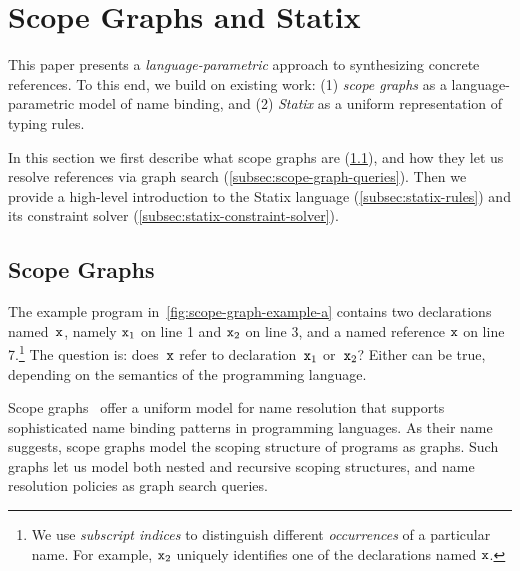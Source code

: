 \section{Scope Graphs and Statix}%
\label{sec:scope-graphs-and-statix}

This paper presents a \emph{language-parametric} approach to synthesizing concrete references.
To this end, we build on existing work: (1) \emph{scope graphs} as a language-parametric model of name binding,
and (2) \emph{Statix} as a uniform representation of typing rules.

In this section we first describe what scope graphs are (\cref{subsec:scope-graphs}), and how they let us resolve references via graph search (\cref{subsec:scope-graph-queries}).
Then we provide a high-level introduction to the Statix language (\cref{subsec:statix-rules}) and its constraint solver (\cref{subsec:statix-constraint-solver}).


\subsection{Scope Graphs}%
\label{subsec:scope-graphs}
The example program in~\cref{fig:scope-graph-example-a} contains two declarations named~$\texttt{x}$, namely $\texttt{x}_{1}$ on line 1 and $\texttt{x}_{2}$ on line 3, and a named reference $\texttt{x}$ on line 7.\footnote{
  We use \emph{subscript indices} to distinguish different \emph{occurrences} of a particular name.
  For example, $\texttt{x}_{2}$ uniquely identifies one of the declarations named $\texttt{x}$.
}
The question is: does~$\texttt{x}$ refer to declaration~$\texttt{x}_{1}$ or~$\texttt{x}_{2}$?
Either can be true, depending on the semantics of the programming language.

Scope graphs~\cite{NeronTVW15,RouvoetAPKV20,AntwerpenPRV18,AntwerpenNTVW16,ZwaanA23} offer a uniform model for name resolution that supports sophisticated name binding patterns in programming languages.
As their name suggests, scope graphs model the scoping structure of programs as graphs.
Such graphs let us model both nested and recursive scoping structures,
and name resolution policies as graph search queries.

